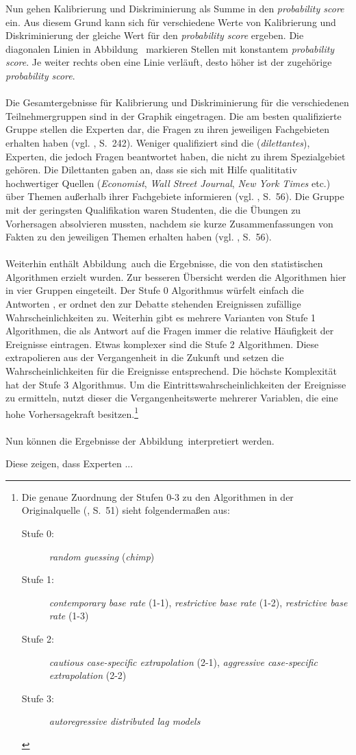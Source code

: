 Nun gehen Kalibrierung und Diskriminierung als Summe in den
\emph{probability score} ein. Aus diesem Grund kann sich für verschiedene
Werte von Kalibrierung und Diskriminierung der gleiche Wert für den
\emph{probability score} ergeben. Die diagonalen Linien in Abbildung~\xcom
markieren Stellen mit konstantem \emph{probability score}. Je weiter rechts oben
eine Linie verläuft, desto höher ist der zugehörige \emph{probability score}.
\\ \\
Die Gesamtergebnisse für Kalibrierung und Diskriminierung für die verschiedenen
Teilnehmergruppen sind in der Graphik eingetragen. Die am besten qualifizierte
Gruppe stellen die Experten dar, die Fragen zu ihren jeweiligen Fachgebieten
erhalten haben (vgl. \cite{Tetlock}, S.~242). Weniger qualifiziert sind die 
\grqq (\emph{dilettantes}), Experten, die jedoch Fragen
beantwortet haben, die nicht zu ihrem Spezialgebiet gehören. Die Dilettanten
gaben an, dass sie sich mit Hilfe qualititativ hochwertiger Quellen
(\emph{Economist}, \emph{Wall Street Journal}, \emph{New York Times} etc.) über
Themen außerhalb ihrer Fachgebiete informieren (vgl. \cite{Tetlock}, S.~56).
Die Gruppe mit der geringsten Qualifikation waren Studenten, die die Übungen
zu Vorhersagen absolvieren mussten, nachdem sie kurze Zusammenfassungen von
Fakten zu den jeweiligen Themen erhalten haben (vgl. \cite{Tetlock}, S.~56).
\\ \\
Weiterhin enthält Abbildung~\xcom auch die Ergebnisse, die von den
statistischen Algorithmen erzielt wurden. Zur besseren Übersicht werden die
Algorithmen hier in vier Gruppen eingeteilt. Der Stufe 0 Algorithmus würfelt
einfach die Antworten , er ordnet den zur Debatte stehenden Ereignissen
zufällige Wahrscheinlichkeiten zu. Weiterhin gibt es mehrere Varianten von
Stufe 1 Algorithmen, die als Antwort auf die Fragen immer die relative
Häufigkeit der Ereignisse eintragen. Etwas komplexer sind die Stufe 2
Algorithmen. Diese extrapolieren aus der Vergangenheit in die Zukunft und setzen
die Wahrscheinlichkeiten für die Ereignisse entsprechend. Die höchste
Komplexität hat der Stufe 3 Algorithmus. Um die Eintrittswahrscheinlichkeiten
der Ereignisse zu ermitteln, nutzt dieser die Vergangenheitswerte mehrerer
Variablen, die eine hohe Vorhersagekraft besitzen.\footnote{Die genaue Zuordnung
der Stufen 0-3 zu den Algorithmen in der Originalquelle (\cite{Tetlock}, S.~51)
sieht folgendermaßen aus:
\begin{description}
\item[Stufe 0:] \emph{random guessing} (\emph{chimp})
\item[Stufe 1:] \emph{contemporary base rate} (1-1), \emph{restrictive base
  rate} (1-2), \emph{restrictive base rate} (1-3)
\item[Stufe 2:] \emph{cautious case-specific extrapolation} (2-1),
  \emph{aggressive case-specific extrapolation} (2-2)
\item[Stufe 3:] \emph{autoregressive distributed lag models}
\end{description}
} \\ \\
Nun können die Ergebnisse der Abbildung~\xcom interpretiert werden.

Diese zeigen, dass Experten ...
